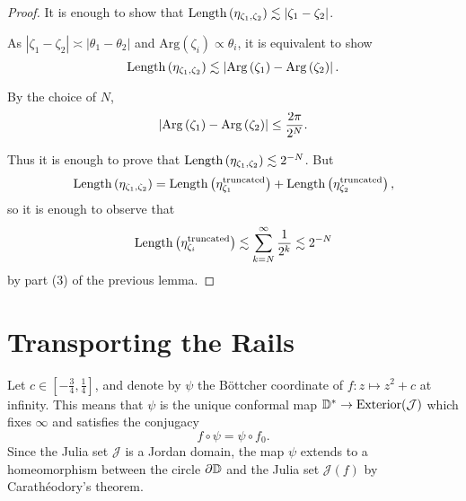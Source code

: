 \begin{proof}
It is enough to show that $\operatorname{Length}\left(\eta_{\zeta_{1},\zeta_{2}}\right)\lesssim\left|\zeta_{1}-\zeta_{2}\right|$.

As $\left|\zeta_{1}-\zeta_{2}\right|\asymp\left|\theta_{1}-\theta_{2}\right|$
and $\mathrm{Arg}\left(\zeta_{i}\right)\propto\theta_{i}$, it is equivalent to show
\[
\operatorname{Length}\left(\eta_{\zeta_{1},\zeta_{2}}\right)\lesssim\left|\operatorname{Arg}\left(\zeta_{1}\right)-\operatorname{Arg}\left(\zeta_{2}\right)\right|.
\]

By the choice of $N$, 
\[
\left|\operatorname{Arg}\left(\zeta_{1}\right)-\operatorname{Arg}\left(\zeta_{2}\right)\right|\leq\frac{2\pi}{2^{N}}.
\]

Thus it is enough to prove that $\operatorname{Length}\left(\eta_{\zeta_{1},\zeta_{2}}\right)\lesssim2^{-N}$.
But 
\[
\operatorname{Length}\left(\eta_{\zeta_{1},\zeta_{2}}\right)=\operatorname{Length}\left(\eta_{\zeta_{1}}^{\text{truncated}}\right)+\operatorname{Length}\left(\eta_{\zeta_{2}}^{\text{truncated}}\right),
\]
so it is enough to observe that 
\[
\operatorname{Length}\left(\eta_{\zeta_{i}}^{\text{truncated}}\right)\lesssim\sum_{k=N}^{\infty}\frac{1}{2^{k}}\lesssim2^{-N}
\]
by part (3) of the previous lemma.

\end{proof}









\section{Transporting the Rails} \label{rails-section}
Let $c\in\left[-\frac 34,\frac{1}{4}\right]$, and denote by $\psi$ the Böttcher coordinate of $f: z\mapsto z^2+c$ at infinity. 
This means that $\psi$ is the unique conformal map $\mathbb{D}^{*}\to\mathrm{Exterior}(\mathcal{J})$  which fixes $\infty$ and satisfies the conjugacy $$f\circ\psi=\psi\circ f_{0}.$$
Since the Julia set $\mathcal J$ is a Jordan domain, the map $\psi$ extends to a homeomorphism between the circle
$\partial\mathbb{D}$ and the Julia set $\mathcal{J}(f)$ by Carathéodory's
theorem.

